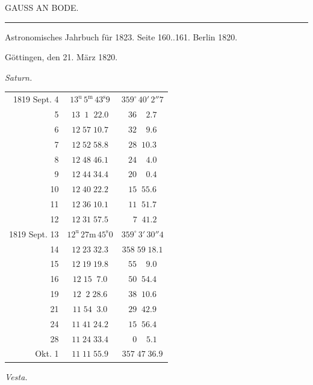 \clearpage
{}
\hypertarget{native-433-part-lower}{}
\begin{center}
{\Large GAUSS AN BODE.}

\rule{0.6\linewidth}{0.4pt}

Astronomisches Jahrbuch für 1823. Seite 160..161. Berlin 1820.
\end{center}

\hfill Göttingen, den 21. März 1820.

\begin{center}
\emph{Saturn.}
\end{center}

\begin{center}
\begin{tabular}{r|c|c}
1819 Sept. 4 & $13^{\mathrm u}\,5^{\mathrm m}\,43^{\mathrm s}9$ & $359^\circ\,40'\,2''7$ \\
5 & $13\;\;1\;\;22.0$ & $36\;\;\;\;2.7$ \\
6 & $12\;57\;10.7$ & $32\;\;\;\;9.6$ \\
7 & $12\;52\;58.8$ & $28\;\;10.3$ \\
8 & $12\;48\;46.1$ & $24\;\;\;\;4.0$ \\
9 & $12\;44\;34.4$ & $20\;\;\;\;0.4$ \\
10 & $12\;40\;22.2$ & $15\;\;55.6$ \\
11 & $12\;36\;10.1$ & $11\;\;51.7$ \\
12 & $12\;31\;57.5$ & $\;\;7\;\;41.2$ \\
\hline
1819 Sept. 13 & $12^{\mathrm u}\,27\mathrm{m}\,45^{\mathrm s}0$ & $359^\circ\,3'\,30''4$ \\
14 & $12\;23\;32.3$ & $358\;59\;18.1$ \\
15 & $12\;19\;19.8$ & $55\;\;\;\;9.0$ \\
16 & $12\;15\;\;7.0$ & $50\;\;54.4$ \\
19 & $12\;\;2\;28.6$ & $38\;\;10.6$ \\
21 & $11\;54\;\;3.0$ & $29\;\;42.9$ \\
24 & $11\;41\;24.2$ & $15\;\;56.4$ \\
28 & $11\;24\;33.4$ & $\;\;0\;\;\;\;5.1$ \\
Okt. 1 & $11\;11\;55.9$ & $357\;47\;36.9$ \\
\end{tabular}
\end{center}

\begin{center}
\textit{Vesta.}
\end{center}

